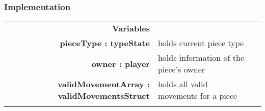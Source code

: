 \documentclass[10pt]{article}
\begin{document}
    \subsubsection{Implementation}
        \begin{longtabu}{ >{\bfseries}r Xp{2cm} }
            Variables       & \begin{tabular}[t]{@{} l p{8cm}} 
                                     & \\
                                    pieceType : typeState & holds current piece type \\
                                    owner : player & holds information of the piece's owner \\
									validMovementArray : validMovementsStruct & holds all valid movements for a piece \\
                              \end{tabular} \\


\end{longtabu}
\end{document}
